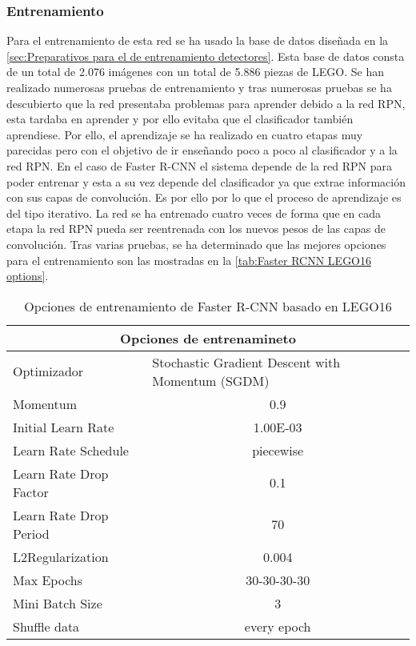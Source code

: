 \subsubsection*{Entrenamiento}
Para el entrenamiento de esta red se ha usado la base de datos diseñada en la \autoref{sec:Preparativos para el de entrenamiento detectores}. Esta base de datos consta de un total de 2.076 imágenes con un total de 5.886 piezas de LEGO. Se han realizado numerosas pruebas de entrenamiento y tras numerosas pruebas se ha descubierto que la red presentaba problemas para aprender debido a la red RPN, esta tardaba en aprender y por ello evitaba que el clasificador también aprendiese. Por ello, el aprendizaje se ha realizado en cuatro etapas muy parecidas pero con el objetivo de ir enseñando poco a poco al clasificador y a la red RPN. En el caso de Faster R-CNN el sistema depende de la red RPN para poder entrenar y esta a su vez depende del clasificador ya que extrae información con sus capas de convolución. Es por ello por lo que el proceso de aprendizaje es del tipo iterativo. La red se ha entrenado cuatro veces de forma que en cada etapa la red RPN pueda ser reentrenada con los nuevos pesos de las capas de convolución. Tras varias pruebas, se ha determinado que las mejores opciones para el entrenamiento son las mostradas en la \autoref{tab:Faster RCNN LEGO16 options}.

\begin{table}[ht]
  \centering
    \begin{tabular}{|l|c|}
    \hline
    \multicolumn{2}{|c|}{Opciones de entrenamineto} \\
    \hline
    Optimizador & \multicolumn{1}{l|}{Stochastic Gradient Descent with Momentum (SGDM)} \\
    \hline
    Momentum & 0.9 \\
    \hline
    Initial Learn Rate & 1.00E-03 \\
    \hline
    Learn Rate Schedule & piecewise \\
    \hline
    Learn Rate Drop Factor & 0.1 \\
    \hline
    Learn Rate Drop Period & 70 \\
    \hline
    L2Regularization & 0.004 \\
    \hline
    Max Epochs & 30-30-30-30 \\
    \hline
    Mini Batch Size & 3 \\
    \hline
    Shuffle data & every epoch \\
    \hline
    \end{tabular}%
  \caption{Opciones de entrenamiento de Faster R-CNN basado en LEGO16}
  \label{tab:Faster RCNN LEGO16 options}%
\end{table}%

